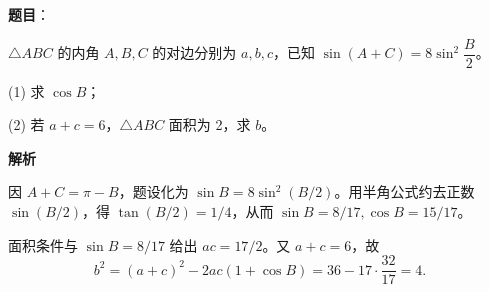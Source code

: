 \begin{answer}

\textbf{题目}：

\(\triangle ABC\) 的内角 \(A,B,C\) 的对边分别为 \(a,b,c\)，已知 \(\sin(A+C)=8\sin^2\dfrac{B}{2}\)。

   (1) 求 \(\cos B\)；

   (2) 若 \(a+c=6\)，\(\triangle ABC\) 面积为 2，求 \(b\)。

\textbf{解析}


因 \(A+C=\pi-B\)，题设化为 \(\sin B=8\sin^2(B/2)\)。用半角公式约去正数 \(\sin(B/2)\)，得 \(\tan(B/2)=1/4\)，从而 \(\sin B=8/17,\cos B=15/17\)。


面积条件与 \(\sin B=8/17\) 给出 \(ac=17/2\)。又 \(a+c=6\)，故
\nopagebreak[4]
\[
b^2=(a+c)^2-2ac(1+\cos B)=36-17\cdot\frac{32}{17}=4.
\]



\end{answer}
